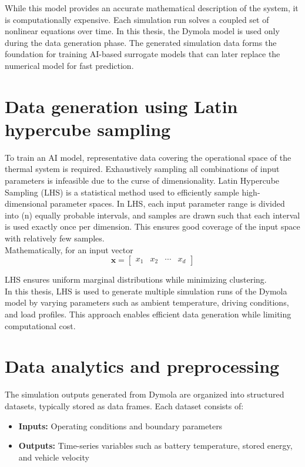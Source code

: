While this model provides an accurate mathematical description of the system, it is computationally expensive. Each simulation run solves a coupled set of nonlinear equations over time. In this thesis, the Dymola model is used only during the data generation phase. The generated simulation data forms the foundation for training AI-based surrogate models that can later replace the numerical model for fast prediction.

\section{Data generation using Latin hypercube sampling}
To train an AI model, representative data covering the operational space of the thermal system is required. Exhaustively sampling all combinations of input parameters is infeasible due to the curse of dimensionality. Latin Hypercube Sampling (LHS) is a statistical method used to efficiently sample high-dimensional parameter spaces.
In LHS, each input parameter range is divided into (n) equally probable intervals, and samples are drawn such that each interval is used exactly once per dimension. This ensures good coverage of the input space with relatively few samples.\\
Mathematically, for an input vector\\

\[
\mathbf{x} = \begin{bmatrix}
x_1 & x_2 & \cdots & x_d
\end{bmatrix}
\]

LHS ensures uniform marginal distributions while minimizing clustering. \\
In this thesis, LHS is used to generate multiple simulation runs of the Dymola model by varying parameters such as ambient temperature, driving conditions, and load profiles. This approach enables efficient data generation while limiting computational cost.


 
\section{Data analytics and preprocessing}
The simulation outputs generated from Dymola are organized into structured datasets, typically stored as data frames. Each dataset consists of:
\begin{itemize}
    \item \textbf{Inputs:} Operating conditions and boundary parameters
    \item \textbf{Outputs:} Time-series variables such as battery temperature, stored energy, and vehicle velocity
\end{itemize}

